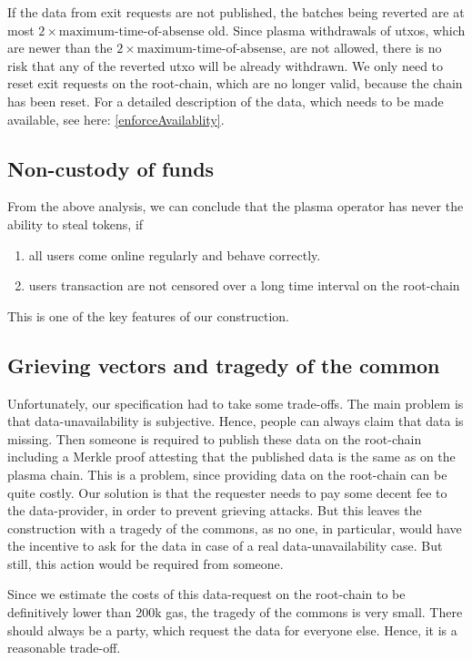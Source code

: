 \documentclass[11pt,parskip=full]{scrartcl}%
\begin{document}
If the data from exit requests are not published, the batches being reverted are at most $2 \times \text{maximum-time-of-absense}$ old. 
Since plasma withdrawals of utxos, which are newer than the $2 \times \text{maximum-time-of-absense}$, are not allowed, there is no risk that any of the reverted utxo will be already withdrawn.
We only need to reset exit requests on the root-chain, which are no longer valid, because the chain has been reset. 
For a detailed description of the data, which needs to be made available, see here: \ref{enforceAvailablity}. 


\subsection{Non-custody of funds}
From the above analysis, we can conclude that the plasma operator has never the ability to steal tokens, if
\begin{enumerate}
\item all users come online regularly and behave correctly. 
\item users transaction are not censored over a long time interval on the root-chain
\end{enumerate}
This is one of the key features of our construction. 

\subsection{Grieving vectors and tragedy of the common}
Unfortunately, our specification had to take some trade-offs. 
The main problem is that data-unavailability is subjective. 
Hence, people can always claim that data is missing. 
Then someone is required to publish these data on the root-chain including a Merkle proof attesting that the published data is the same as on the plasma chain. 
This is a problem, since providing data on the root-chain can be quite costly. 
Our solution is that the requester needs to pay some decent fee to the data-provider, in order to prevent grieving attacks. 
But this leaves the construction with a tragedy of the commons, as no one, in particular, would have the incentive to ask for the data in case of a real data-unavailability case. 
But still, this action would be required from someone. 

Since we estimate the costs of this data-request on the root-chain to be definitively lower than 200k gas, the tragedy of the commons is very small. 
There should always be a party, which request the data for everyone else. Hence, it is a reasonable trade-off. 
\end{document}
